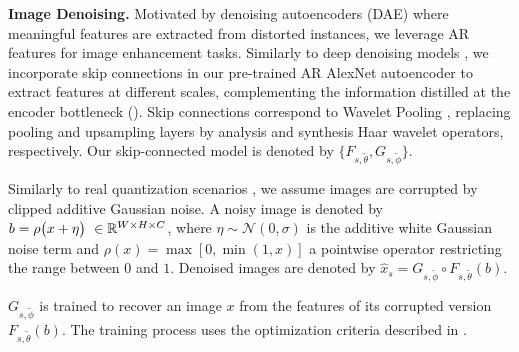 \textbf{Image Denoising.} Motivated by denoising autoencoders (DAE) \cite{vincent_2010_stacked} where meaningful features are extracted from distorted instances, we leverage AR features for image enhancement tasks. Similarly to deep denoising models \cite{mao_2016_image}, we incorporate skip connections in our pre-trained AR AlexNet autoencoder to extract features at different scales, complementing the information distilled at the encoder bottleneck ().
Skip connections correspond to Wavelet Pooling \cite{yoo_2019_photorealistic}, replacing pooling and upsampling layers by analysis and synthesis Haar wavelet operators, respectively. Our skip-connected model is denoted by $\{F_{s, \tilde{\theta}}, G_{s, \tilde{\phi}}\}$.

Similarly to real quantization scenarios \cite{el_2020_blind,zhang_2018_ffdnet,moeller_2015_learning}, we assume images are corrupted by clipped additive Gaussian noise. A noisy image is denoted by $b= \rho\big(x+\eta\big)\ \in \mathbb{R}^{W\times H\times C}$, where $\eta\sim \mathcal{N}(0, \sigma)$ is the additive white Gaussian noise term and $\rho(x)= \max[0, \min(1, x)]$ a pointwise operator restricting the range between $0$ and $1$. Denoised images are denoted by $\hat{x}_{s}= G_{s,\tilde{\phi}}\circ F_{s,\tilde{\theta}}(b)$.

$G_{s, \tilde{\phi}}$ is trained to recover an image $x$ from the features of its corrupted version $F_{s, \tilde{\theta}}(b)$. The training process uses the optimization criteria described in .
